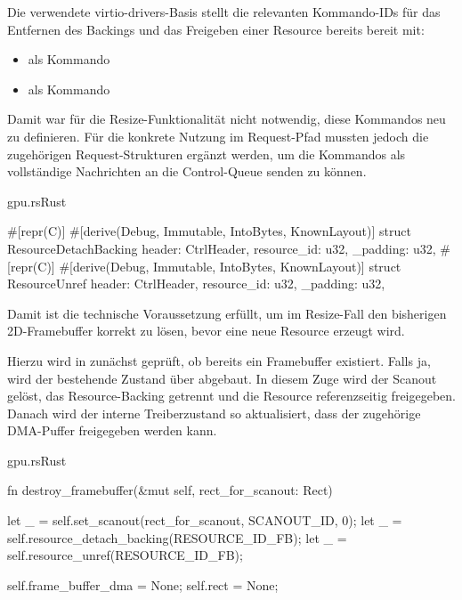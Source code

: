 Die verwendete virtio-drivers-Basis stellt die relevanten Kommando-IDs für das Entfernen des Backings und das Freigeben einer Resource bereits bereit mit:

\begin{itemize}
 \item {} als Kommando 
 \item {} als Kommando 
\end{itemize}

Damit war für die Resize-Funktionalität nicht notwendig, diese Kommandos neu zu definieren. Für die konkrete Nutzung im Request-Pfad mussten jedoch die zugehörigen Request-Strukturen ergänzt werden, um die Kommandos als vollständige Nachrichten an die Control-Queue senden zu können.

\begin{codeblock}{gpu.rs}{Rust}
  \begin{rustcode}
#[repr(C)]
#[derive(Debug, Immutable, IntoBytes, KnownLayout)]
struct ResourceDetachBacking {
    header: CtrlHeader,
    resource_id: u32,
    _padding: u32,
}
#[repr(C)]
#[derive(Debug, Immutable, IntoBytes, KnownLayout)]
struct ResourceUnref {
    header: CtrlHeader,
    resource_id: u32,
    _padding: u32,
}
  \end{rustcode}
\end{codeblock}

Damit ist die technische Voraussetzung erfüllt, um im Resize-Fall den bisherigen 2D-Framebuffer korrekt zu lösen, bevor eine neue Resource erzeugt wird.

Hierzu wird in  zunächst geprüft, ob bereits ein Framebuffer existiert. Falls ja, wird der bestehende Zustand über  abgebaut. In diesem Zuge wird der Scanout gelöst, das Resource-Backing getrennt und die Resource referenzseitig freigegeben. Danach wird der interne Treiberzustand so aktualisiert, dass der zugehörige DMA-Puffer freigegeben werden kann.

\begin{codeblock}{gpu.rs}{Rust}
  \begin{rustcode}
fn destroy_framebuffer(&mut self, rect_for_scanout: Rect) {
    let _ = self.set_scanout(rect_for_scanout, SCANOUT_ID, 0);
    let _ = self.resource_detach_backing(RESOURCE_ID_FB);
    let _ = self.resource_unref(RESOURCE_ID_FB);

    self.frame_buffer_dma = None;
    self.rect = None;
}
  \end{rustcode}
\end{codeblock}

